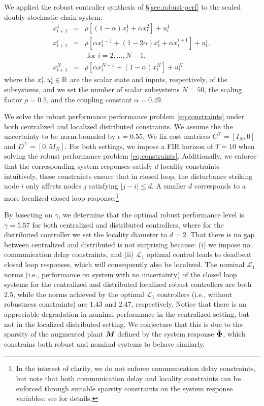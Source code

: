 We applied the robust controller synthesis of \S \ref{sec:robust-perf} to the scaled doubly-stochastic chain system:
\begin{equation}\label{eq:chain}
\begin{array}{rcl}
x^1_{t+1} &=& \rho\left[(1-\alpha)x^1_t + \alpha x^2_t\right] + u^1_t\\
x^i_{t+1} &=& \rho\left[\alpha x^{i-1}_t + (1-2\alpha)x^i_t + \alpha x^{i+1}_t\right] + u^i_t,\\
&& \text{ for $i=2,\dots,N-1$,} \\
 x^N_{t+1} &=& \rho\left[\alpha x^{N-1}_t + (1-\alpha)x^N_t\right] + u^N_t
 \end{array}
\end{equation}
where the $x^i_t, u^i_t \in \mathbb{R}$ are the scalar state and inputs, respectively, of the subsystems, and we set the number of scalar subsystems $N=50$, the scaling factor $\rho = 0.5$, and the coupling constant $\alpha = 0.49$.  

We solve the robust performance performance problem \eqref{eq:constraints} under both centralized and localized distributed constraints. We assume the the uncertainty to be norm-bounded by $\epsilon = 0.55$. We fix cost matrices $C^\top = [I_N, 0]$ and $D^\top = [0, 5I_N]$.  For both settings, we impose a FIR horizon of $T=10$ when solving the robust performance problem \eqref{eq:constraints}.  Additionally, we enforce that the corresponding system responses satisfy $d$-locality constraints -- intuitively, these constraints ensure that in closed loop, the disturbance striking node $i$ only affects nodes $j$ satisfying $|j-i|\leq d$. A smaller $d$ corresponds to a more localized closed loop response.\footnote{In the interest of clarity, we do not enforce communication delay constraints, but note that both communication delay and locality constraints can be enforced through suitable sparsity constraints on the system response variables: see \cite{anderson2019system} for details.}

By bisecting on $\gamma$, we determine that the optimal robust performance level is $\gamma = 5.57$ for both centralized and distributed controllers, where for the distributed controller we set the locality diameter to $d=2$.  That there is no gap between centralized and distributed is not surprising because: (i) we impose no communication delay constraints, and (ii) $\mathcal{L}_1$ optimal control leads to deadbeat closed loop responses, which will consequently also be localized.  The nominal $\mathcal{L}_1$ norms  (i.e., performance on system with no uncertainty) of the closed loop systems for the centralized and distributed localized robust controllers are both $2.5$, while the norms achieved by the optimal $\mathcal{L}_1$ controllers (i.e., without robustness constraints) are $1.43$ and $2.47$, respectively.  Notice that there is an appreciable degradation in nominal performance in the centralized setting, but not in the localized distributed setting.  We conjecture that this is due to the sparsity of the augmented plant $\boldsymbol{M}$ defined by the system response $\hat{\boldsymbol{\Phi}}$, which constrains both robust and nominal systems to behave similarly.

